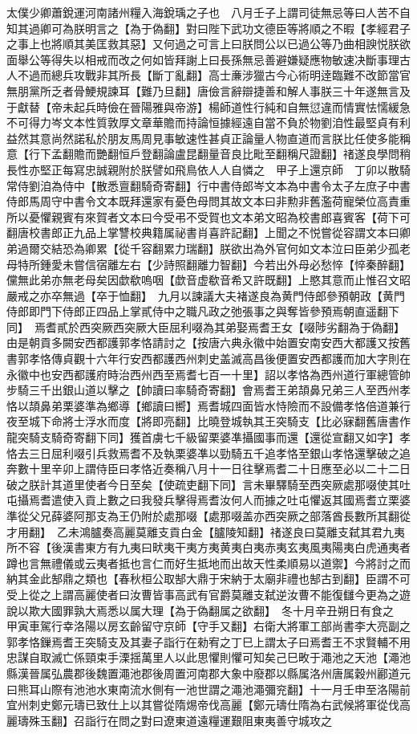 太僕少卿蕭銳運河南諸州糧入海銳瑀之子也　八月壬子上謂司徒無忌等曰人苦不自知其過卿可為朕明言之【為于偽翻】對曰陛下武功文德臣等將順之不暇【孝經君子之事上也將順其美匡救其惡】又何過之可言上曰朕問公以已過公等乃曲相諛悦朕欲面舉公等得失以相戒而改之何如皆拜謝上曰長孫無忌善避嫌疑應物敏速决斷事理古人不過而總兵攻戰非其所長【斷丁亂翻】高士亷涉獵古今心術明逹臨難不改節當官無朋黨所乏者骨鯁規諫耳【難乃旦翻】唐儉言辭辯捷善和解人事朕三十年遂無言及于獻替【帝未起兵時儉在晉陽雅與帝游】楊師道性行純和自無愆違而情實怯懦緩急不可得力岑文本性質敦厚文章華贍而持論恒據經遠自當不負於物劉洎性最堅貞有利益然其意尚然諾私於朋友馬周見事敏速性甚貞正論量人物直道而言朕比任使多能稱意【行下孟翻贍而艷翻恒戶登翻論盧昆翻量音良比毗至翻稱尺證翻】禇遂良學問稍長性亦堅正每寫忠誠親附於朕譬如飛鳥依人人自憐之　甲子上還京師　丁卯以散騎常侍劉洎為侍中【散悉亶翻騎奇寄翻】行中書侍郎岑文本為中書令太子左庶子中書侍郎馬周守中書令文本既拜還家有憂色母問其故文本曰非勲非舊濫荷寵榮位高責重所以憂懼親賓有來賀者文本曰今受弔不受賀也文本弟文昭為校書郎喜賓客【荷下可翻唐校書郎正九品上掌讐校典籍属祕書肖喜許記翻】上聞之不悦嘗從容謂文本曰卿弟過爾交結恐為卿累【從千容翻累力瑞翻】朕欲出為外官何如文本泣曰臣弟少孤老母特所鍾愛未嘗信宿離左右【少詩照翻離力智翻】今若出外母必愁悴【悴秦醉翻】儻無此弟亦無老母矣因歔欷嗚咽【歔音虚欷音希又許既翻】上愍其意而止惟召文昭嚴戒之亦卒無過【卒于恤翻】　九月以諫議大夫褚遂良為黄門侍郎參預朝政【黄門侍郎即門下侍郎正四品上掌貳侍中之職凡政之弛張事之與奪皆參預焉朝直遥翻下同】　焉耆貳於西突厥西突厥大臣屈利啜為其弟娶焉耆王女【啜陟劣翻為于偽翻】由是朝貢多闕安西都護郭孝恪請討之【按唐六典永徽中始置安南安西大都護又按舊書郭孝恪傳貞觀十六年行安西都護西州刺史盖滅高昌後便置安西都護而加大字則在永徽中也安西都護府時治西州西至焉耆七百一十里】詔以孝恪為西州道行軍總管帥步騎三千出銀山道以擊之【帥讀曰率騎奇寄翻】會焉耆王弟頡鼻兄弟三人至西州孝恪以頡鼻弟栗婆準為鄉導【鄉讀曰嚮】焉耆城四面皆水恃險而不設備孝恪倍道兼行夜至城下命將士浮水而度【將即亮翻】比曉登城執其王突騎支【比必寐翻舊唐書作龍突騎支騎奇寄翻下同】獲首虜七千級留栗婆凖攝國事而還【還從宣翻又如字】孝恪去三日屈利啜引兵救焉耆不及執栗婆凖以勁騎五千追孝恪至銀山孝恪還擊破之追奔數十里辛卯上謂侍臣曰孝恪近奏稱八月十一日往擊焉耆二十日應至必以二十二日破之朕計其道里使者今日至矣【使疏吏翻下同】言未畢驛騎至西突厥處那啜使其吐屯攝焉耆遣使入貢上數之曰我發兵擊得焉耆汝何人而據之吐屯懼返其國焉耆立栗婆準從父兄薛婆阿那支為王仍附於處那啜【處那啜盖亦西突厥之部落酋長數所其翻從才用翻】　乙未鴻臚奏高麗莫離支貢白金【臚陵知翻】禇遂良曰莫離支弑其君九夷所不容【後漢書東方有九夷曰畎夷干夷方夷黄夷白夷赤夷玄夷風夷陽夷白虎通夷者蹲也言無禮儀或云夷者抵也言仁而好生抵地而出故天性柔順易以道禦】今將討之而納其金此郜鼎之類也【春秋桓公取郜大鼎于宋納于太廟非禮也郜古到翻】臣謂不可受上從之上謂高麗使者曰汝曹皆事高武有官爵莫離支弑逆汝曹不能復讎今更為之遊說以欺大國罪孰大焉悉以属大理【為于偽翻属之欲翻】　冬十月辛丑朔日有食之　甲寅車駕行幸洛陽以房玄齡留守京師【守手又翻】右衛大將軍工部尚書李大亮副之　郭孝恪鏁焉耆王突騎支及其妻子詣行在勑宥之丁巳上謂太子曰焉耆王不求賢輔不用忠謀自取滅亡係頸束手溧揺萬里人以此思懼則懼可知矣己巳畋于澠池之天池【澠池縣漢晉属弘農郡後魏置澠池郡後周置河南郡大象中廢郡以縣属洛州唐属穀州酈道元曰熊耳山際有池池水東南流水側有一池世謂之澠池澠彌兖翻】十一月壬申至洛陽前宜州刺史鄭元璹已致仕上以其嘗從隋焬帝伐高麗【鄭元璹仕隋為右武候將軍從伐高麗璹殊玉翻】召詣行在問之對曰遼東道遠糧運艱阻東夷善守城攻之